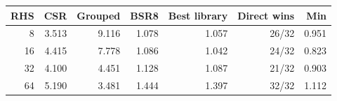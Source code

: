 \begin{tabular}{rrrrrrr}
\toprule
RHS & CSR & Grouped & BSR8 & Best library & Direct wins & Min \\
\midrule
8 & 3.513 & 9.116 & 1.078 & 1.057 & 26/32 & 0.951 \\
16 & 4.415 & 7.778 & 1.086 & 1.042 & 24/32 & 0.823 \\
32 & 4.100 & 4.451 & 1.128 & 1.087 & 21/32 & 0.903 \\
64 & 5.190 & 3.481 & 1.444 & 1.397 & 32/32 & 1.112 \\
\bottomrule
\end{tabular}
